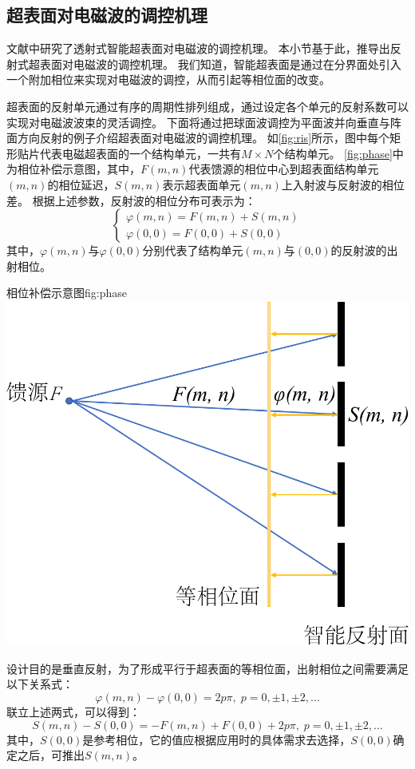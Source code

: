 \documentclass[supercite]{HustGraduPaper}
\begin{document}
\subsection{超表面对电磁波的调控机理}

文献中研究了透射式智能超表面对电磁波的调控机理。
本小节基于此，推导出反射式超表面对电磁波的调控机理。
我们知道，智能超表面是通过在分界面处引入一个附加相位来实现对电磁波的调控，从而引起等相位面的改变。

超表面的反射单元通过有序的周期性排列组成，通过设定各个单元的反射系数可以实现对电磁波波束的灵活调控。
下面将通过把球面波调控为平面波并向垂直与阵面方向反射的例子介绍超表面对电磁波的调控机理。
如\autoref{fig:ris}所示，图中每个矩形贴片代表电磁超表面的一个结构单元，一共有$M \times N$个结构单元。
\autoref{fig:phase}中为相位补偿示意图，其中，$F(m,n)$代表馈源的相位中心到超表面结构单元$(m,n)$的相位延迟，$S(m,n)$表示超表面单元$(m,n)$上入射波与反射波的相位差。
根据上述参数，反射波的相位分布可表示为：
\begin{equation}
	\left\{
		\begin{array}{l}
			\varphi(m,n)=F(m,n)+S(m,n) \\
			\varphi(0,0)=F(0,0)+S(0,0)
		\end{array}
	\right.
\end{equation}
其中，$\varphi(m,n)$与$\varphi(0,0)$分别代表了结构单元$(m,n)$与$(0,0)$的反射波的出射相位。
 
\begin{generalfig}[htb]{相位补偿示意图}{fig:phase}
	\includegraphics[width=0.5\linewidth]{Figures/phase.pdf}
\end{generalfig}

设计目的是垂直反射，为了形成平行于超表面的等相位面，出射相位之间需要满足以下关系式：
\begin{equation}
	\varphi (m,n) - \varphi (0,0) = 2p \pi, \; p = 0, \pm 1,\pm 2,\dots 
\end{equation}
联立上述两式，可以得到：
\begin{equation}
	S(m,n)-S(0,0)=-F(m,n)+F(0,0)+2p\pi, \; p = 0, \pm 1,\pm 2,\dots 
\end{equation}
其中，$S(0,0)$是参考相位，它的值应根据应用时的具体需求去选择，$S(0,0)$确定之后，可推出$S(m,n)$。
\end{document}
